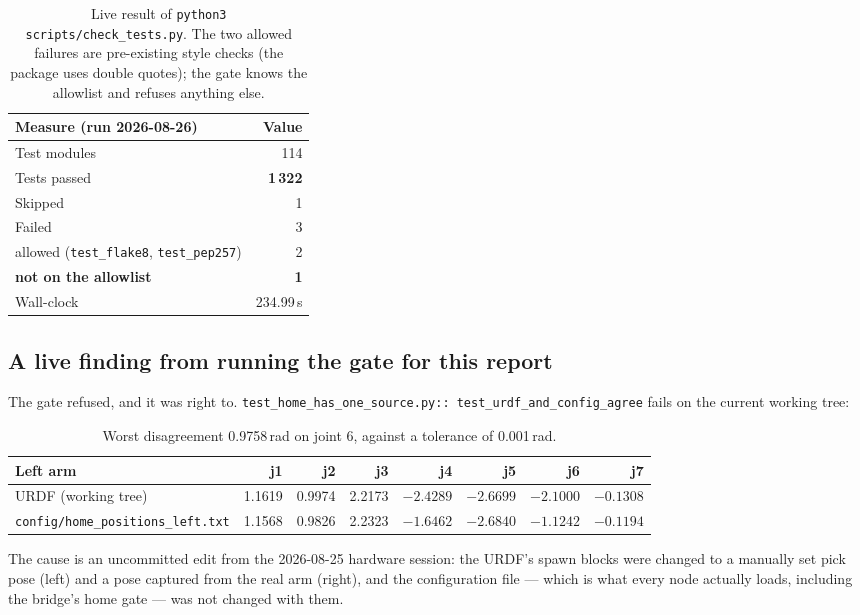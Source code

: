 \documentclass[11pt,a4paper,oneside]{report}
\newcommand{\code}[1]{\texttt{\small #1}}
\newcommand{\file}[1]{\texttt{\small #1}}
\begin{document}
\begin{table}[H]
\centering
\small
\begin{tabular}{@{}lr@{}}
\toprule
\textbf{Measure (run 2026-08-26)} & \textbf{Value} \\
\midrule
Test modules & 114 \\
Tests passed & \textbf{1\,322} \\
Skipped & 1 \\
Failed & 3 \\
\quad allowed (\code{test\_flake8}, \code{test\_pep257}) & 2 \\
\quad \textbf{not on the allowlist} & \textbf{1} \\
Wall-clock & 234.99\,s \\
\bottomrule
\end{tabular}
\caption{Live result of \code{python3 scripts/check\_tests.py}. The two allowed
failures are pre-existing style checks (the package uses double quotes); the
gate knows the allowlist and refuses anything else.}
\end{table}

\subsection{A live finding from running the gate for this report}

The gate refused, and it was right to. \file{test\_home\_has\_one\_source.py::
test\_urdf\_and\_config\_agree} fails on the current working tree:

\begin{table}[H]
\centering
\small
\begin{tabular}{@{}lrrrrrrr@{}}
\toprule
\textbf{Left arm} & \textbf{j1} & \textbf{j2} & \textbf{j3} & \textbf{j4} & \textbf{j5} & \textbf{j6} & \textbf{j7} \\
\midrule
URDF (working tree) & 1.1619 & 0.9974 & 2.2173 & $-2.4289$ & $-2.6699$ & $-2.1000$ & $-0.1308$ \\
\file{config/home\_positions\_left.txt} & 1.1568 & 0.9826 & 2.2323 & $-1.6462$ & $-2.6840$ & $-1.1242$ & $-0.1194$ \\
\bottomrule
\end{tabular}
\caption{Worst disagreement 0.9758\,rad on joint 6, against a tolerance of
0.001\,rad.}
\end{table}

The cause is an uncommitted edit from the 2026-08-25 hardware session: the
URDF's spawn blocks were changed to a manually set pick pose (left) and a pose
captured from the real arm (right), and the configuration file --- which is
what every node actually loads, including the bridge's home gate --- was not
changed with them.
\end{document}
